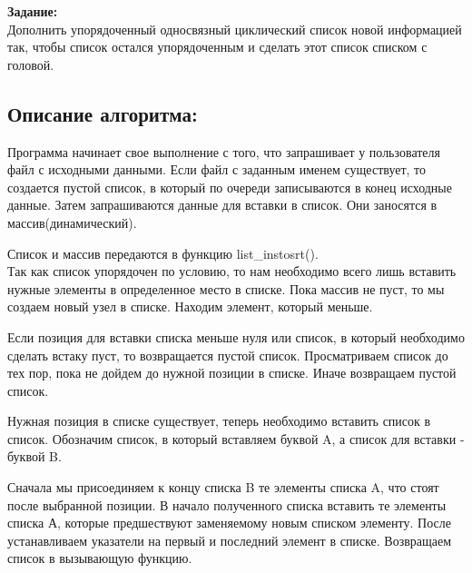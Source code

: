 \documentclass[a4paper,14pt]{extreport}
\begin{document}

\textbf{Задание:}\\
 	Дополнить упорядоченный односвязный циклический список новой информацией так, чтобы список остался упорядоченным и сделать этот список списком с головой.
\subsection*{Описание алгоритма:}
Программа начинает свое выполнение с того, что запрашивает у пользователя файл с исходными данными.
Если файл с заданным именем существует, то создается пустой список, в который по очереди записываются в конец исходные данные.
Затем запрашиваются данные для вставки в список. Они заносятся в массив(динамический).

Список и массив передаются в функцию list\_instosrt().\\ 

Так как список упорядочен по условию, то нам необходимо всего лишь вставить нужные элементы в определенное место в списке.
Пока массив не пуст, то мы создаем новый узел в списке. Находим элемент, который меньше. 

Если позиция для вставки списка меньше нуля или список, в который необходимо сделать встаку пуст, то возвращается пустой список. 
Просматриваем список до тех пор, пока не дойдем до нужной позиции в списке. Иначе возвращаем пустой список. 

Нужная позиция в списке существует, теперь необходимо вставить список в список. 
Обозначим список, в который вставляем буквой A, а список для вставки - буквой B.

Сначала мы присоединяем к концу списка B те элементы списка A, что стоят после выбранной позиции. 
В начало полученного списка вставить те элементы списка А, которые предшествуют заменяемому новым списком элементу.
После устанавливаем указатели на первый и последний элемент в списке. Возвращаем список в вызывающую функцию. 
\end{document}
